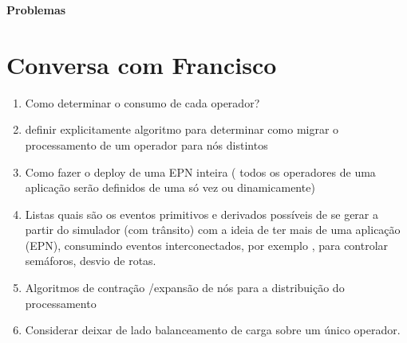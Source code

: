 %
%
%
%
\newpage
\textbf{\Huge{Problemas}}

\section{Conversa com Francisco}
\begin{enumerate}
\item Como determinar o consumo de cada operador?
\item definir explicitamente algoritmo para determinar como migrar o processamento de um operador para nós distintos
\item Como fazer o deploy de uma EPN inteira ( todos os operadores de uma aplicação serão definidos de uma só vez ou dinamicamente)
\item Listas quais são os eventos primitivos e derivados possíveis de se gerar a partir do simulador (com trânsito) com a ideia de ter mais de uma aplicação (EPN), consumindo eventos interconectados, por exemplo , para controlar semáforos, desvio de rotas.
\item Algoritmos de contração /expansão de nós para a distribuição do processamento
\item Considerar deixar de lado balanceamento de carga sobre um único operador.
\end{enumerate}

